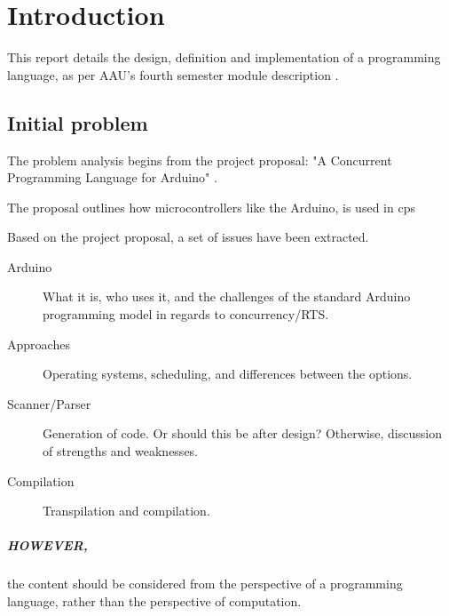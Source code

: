 \chapter{Introduction}\label{cha:introduction}
This report details the design, definition and implementation of a programming language, as per AAU's fourth semester module description  \cite{AAU_Modules_P4}.

\section{Initial problem}
The problem analysis begins from the project proposal: "A Concurrent Programming Language for Arduino" \cite{Project_Proposals_2022}.

The proposal outlines how microcontrollers like the Arduino, is used in \gls{cps}

Based on the project proposal, a set of issues have been extracted.




\begin{description}
    \item [Arduino] What it is, who uses it, and the challenges of the standard Arduino programming  model in regards to concurrency/RTS.
    \item [Approaches] Operating systems, scheduling, and differences between the options.
    \item [Scanner/Parser] Generation of code. Or should this be after design? Otherwise, discussion of strengths and weaknesses.
    \item [Compilation] Transpilation and compilation.
\end{description}

\paragraph{HOWEVER,} the content should be considered from the perspective of a programming language, rather than the perspective of computation.